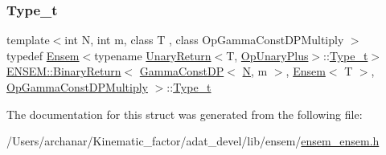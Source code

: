 \subsubsection{\texorpdfstring{Type\_t}{Type\_t}\hspace{0.1cm}{\footnotesize\ttfamily [2/2]}}
{\footnotesize\ttfamily template$<$int N, int m, class T , class Op\+Gamma\+Const\+D\+P\+Multiply $>$ \\
typedef \mbox{\hyperlink{classENSEM_1_1Ensem}{Ensem}}$<$typename \mbox{\hyperlink{structENSEM_1_1UnaryReturn}{Unary\+Return}}$<$T, \mbox{\hyperlink{structENSEM_1_1OpUnaryPlus}{Op\+Unary\+Plus}}$>$\+::\mbox{\hyperlink{structENSEM_1_1BinaryReturn_3_01GammaConstDP_3_01N_00_01m_01_4_00_01Ensem_3_01T_01_4_00_01OpGammaConstDPMultiply_01_4_a839d901ca5cc60b6e639f680b072d368}{Type\+\_\+t}}$>$ \mbox{\hyperlink{structENSEM_1_1BinaryReturn}{E\+N\+S\+E\+M\+::\+Binary\+Return}}$<$ \mbox{\hyperlink{classENSEM_1_1GammaConstDP}{Gamma\+Const\+DP}}$<$ \mbox{\hyperlink{operator__name__util_8cc_a7722c8ecbb62d99aee7ce68b1752f337}{N}}, m $>$, \mbox{\hyperlink{classENSEM_1_1Ensem}{Ensem}}$<$ T $>$, \mbox{\hyperlink{structENSEM_1_1OpGammaConstDPMultiply}{Op\+Gamma\+Const\+D\+P\+Multiply}} $>$\+::\mbox{\hyperlink{structENSEM_1_1BinaryReturn_3_01GammaConstDP_3_01N_00_01m_01_4_00_01Ensem_3_01T_01_4_00_01OpGammaConstDPMultiply_01_4_a839d901ca5cc60b6e639f680b072d368}{Type\+\_\+t}}}



The documentation for this struct was generated from the following file\+:\begin{DoxyCompactItemize}
\item 
/\+Users/archanar/\+Kinematic\+\_\+factor/adat\+\_\+devel/lib/ensem/\mbox{\hyperlink{lib_2ensem_2ensem__ensem_8h}{ensem\+\_\+ensem.\+h}}\end{DoxyCompactItemize}
